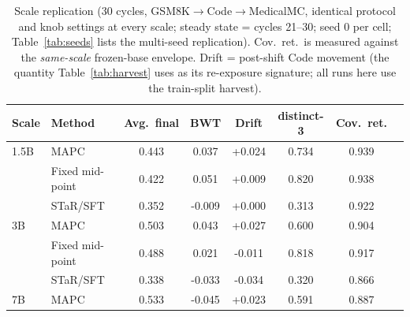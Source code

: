 \begin{table}[t]
\caption{Scale replication (30 cycles, GSM8K$\to$Code$\to$MedicalMC, identical protocol and knob settings at every scale; steady state = cycles 21--30; seed 0 per cell; Table~\ref{tab:seeds} lists the multi-seed replication). Cov.\ ret.\ is measured against the \emph{same-scale} frozen-base envelope. Drift = post-shift Code movement (the quantity Table~\ref{tab:harvest} uses as its re-exposure signature; all runs here use the train-split harvest).}
\label{tab:scale}
\centering
\begin{tabular}{@{}llcccccc@{}}
\toprule
Scale & Method & Avg.\ final & BWT & Drift & distinct-3 & Cov.\ ret. \\
\midrule
1.5B & MAPC & 0.443 & 0.037 & +0.024 & 0.734 & 0.939 \\
 & Fixed mid-point & 0.422 & 0.051 & +0.009 & 0.820 & 0.938 \\
 & STaR/SFT & 0.352 & -0.009 & +0.000 & 0.313 & 0.922 \\
\midrule
3B & MAPC & 0.503 & 0.043 & +0.027 & 0.600 & 0.904 \\
 & Fixed mid-point & 0.488 & 0.021 & -0.011 & 0.818 & 0.917 \\
 & STaR/SFT & 0.338 & -0.033 & -0.034 & 0.320 & 0.866 \\
\midrule
7B & MAPC & 0.533 & -0.045 & +0.023 & 0.591 & 0.887 \\
\bottomrule
\end{tabular}
\end{table}
